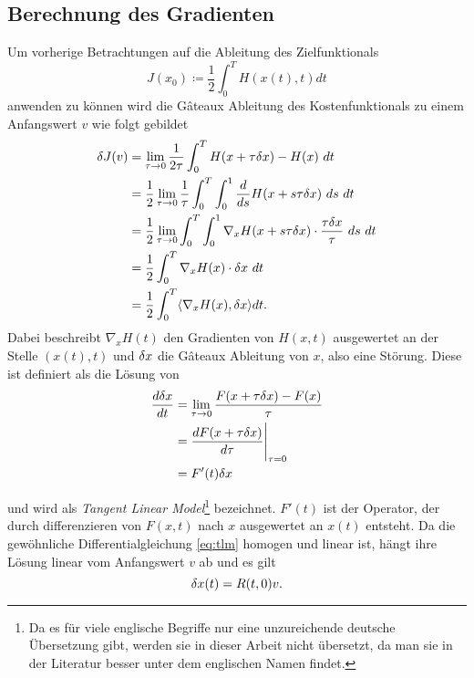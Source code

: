 \subsection{Berechnung des Gradienten}
Um vorherige Betrachtungen auf die Ableitung des Zielfunktionals 
\begin{equation}\label{eq:costfunctionalGen}
 J(x_0) \coloneqq \frac{1}{2}\int_0^T H(x(t),t)dt 
\end{equation}
anwenden zu können wird die Gâteaux Ableitung des Kostenfunktionals 
zu einem Anfangswert $v$ wie folgt gebildet
\begin{equation}
\label{eq:gatcost}
\begin{aligned}
 \delta J(v)  &= \lim_{\tau\to 0} \frac{1}{2\tau}\int_0^T H(x+\tau\delta x)-H(x)~ dt\\
	    &= \frac{1}{2}\lim_{\tau\to 0} \frac{1}{\tau}\int_0^T \int_0^1 \frac{d}{ds}H(x+s\tau\delta x) ~ds~ dt\\
	    &= \frac{1}{2}\lim_{\tau\to 0} \int_0^T \int_0^1 \nabla_x H(x+s\tau\delta x)\cdot \frac{\tau \delta x}{\tau} ~ds ~dt\\
	    &= \frac{1}{2}\int_0^T \nabla_x H(x)\cdot \delta x~ dt\\
	    &= \frac{1}{2}\int_0^T \langle \nabla_x H(x), \delta x \rangle dt .\\  
\end{aligned}
\end{equation}
Dabei beschreibt $\nabla_x H(t)$ den Gradienten von $H(x,t)$ ausgewertet an der Stelle $(x(t),t)$ und $\delta x$ die Gâteaux Ableitung von $x$, also eine Störung. Diese ist definiert als die Lösung von
\begin{equation}
\label{eq:tlm}
\begin{aligned}
  \frac{d \delta x}{dt} &= \lim_{\tau\to 0}\frac{F(x+\tau \delta x)-F(x)}{\tau}\\
			 &= \frac{d F(x+\tau\delta x)}{d\tau} \Bigg\rvert_{\tau=0}\\
			 &= F'(t)\delta x
\end{aligned} 
\end{equation}

und wird als \textit{Tangent Linear Model}\footnote{Da es für viele englische Begriffe nur eine unzureichende deutsche Übersetzung gibt, werden sie in dieser Arbeit nicht übersetzt, da man sie in der Literatur besser unter dem englischen Namen findet.} bezeichnet. $F'(t)$ ist der Operator, der durch differenzieren von $F(x,t)$ nach $x$ ausgewertet an $x(t)$ entsteht. Da die gewöhnliche Differentialgleichung \eqref{eq:tlm} homogen und linear ist, hängt ihre Lösung linear vom Anfangswert $v$ ab und es gilt
\begin{equation}
\label{eq:resolvent}
 \delta x(t) = R(t,0)v.
\end{equation}

